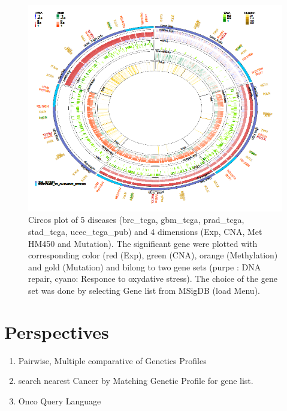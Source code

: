 \documentclass[a4paper]{article}
\begin{document}
    \begin{figure}[!ht]
  \centering
 \includegraphics[scale=0.6]{image/Circos.png}
 \caption{Circos plot of 5 diseases (brc\_tcga, gbm\_tcga, prad\_tcga, stad\_tcga, ucec\_tcga\_pub) and 4 dimensions (Exp, CNA, Met HM450 and Mutation). The significant gene were plotted with corresponding color (red (Exp), green (CNA), orange (Methylation) and gold (Mutation) and bilong to two gene sets (purpe : DNA repair, cyano: Responce to oxydative stress). The choice of the gene set was done by selecting Gene list from MSigDB (load Menu).}
 \label{Circos}
 \end{figure}
 
\section{Perspectives}
\begin{enumerate}
    \item Pairwise, Multiple comparative of Genetics Profiles
    \item search nearest Cancer by Matching Genetic Profile for gene list.
    \item Onco Query Language
\end{enumerate}
 




\end{document}
